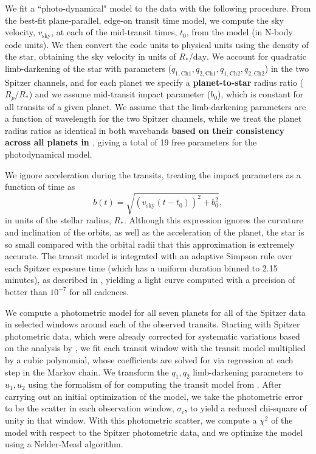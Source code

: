 \documentclass[twocolumn]{aastex63}
\begin{document}
We fit a ``photo-dynamical" model \citep{Carter2012} to the data with the following procedure.
From the best-fit plane-parallel, edge-on transit time model,
we compute the sky velocity, $v_\mathrm{sky}$, at each of the mid-transit times, $t_0$,
from the model (in N-body code units).  We then convert the code units to physical
units using the density of the star, obtaining the sky velocity in units
of $R_*/\mathrm{day}$.
We account for quadratic limb-darkening of the star with parameters ($q_\mathrm{1,Ch1}, q_\mathrm{2,Ch1},q_\mathrm{1,Ch2},q_\mathrm{2,Ch2}$) in the two Spitzer channels, and for each
planet we specify a \textbf{planet-to-star} radius ratio ($R_p/R_*$) and we assume
mid-transit impact parameter ($b_0$), which is constant for all transits of
a given planet.  We assume that the limb-darkening parameters are a function
of wavelength for the two Spitzer channels, while we treat the planet radius
ratios as identical in both wavebands \textbf{based on their consistency across
all planets in \citep{Ducrot2020}}, giving a total of 19 free parameters
for the photodynamical model.

We ignore acceleration during the transits, treating the impact parameters as
a function of time as
\begin{equation}
    b(t) = \sqrt{(v_\mathrm{sky} (t-t_0))^2 + b_0^2},
\end{equation}
in units of the stellar radius, $R_*$.
Although this expression ignores the curvature and inclination of the orbits, as well
as the acceleration of the planet, the star is so small compared with the orbital
radii that this approximation is extremely accurate.  The transit model is integrated
with an adaptive Simpson rule over each Spitzer exposure time (which has a uniform
duration binned to 2.15 minutes), as described in \citet{Agol2019}, yielding
a light curve computed with a precision of better than $10^{-7}$ for all cadences.

We compute a photometric model for all seven
planets for all of the Spitzer data in selected windows around each of the observed
transits.  Starting with Spitzer photometric data, which were already corrected for systematic
variations based on the analysis by \citet{Ducrot2020}, we fit  each transit window
with the transit model multiplied by a cubic polynomial, whose coefficients are solved
for via regression at each step in the Markov chain.
We
transform the $q_1, q_2$ limb-darkening
parameters to $u_1,u_2$ using the formalism of \citet{Kipping2013} for computing the transit model from \citet{Agol2019}.  After carrying out an initial
optimization of the model, we take the photometric error to be the
scatter in each observation window, $\sigma_i$\textbf{,} to yield a reduced chi-square of unity in
that  window.  With this photometric
scatter, we compute a $\chi^2$ of the model with respect to the Spitzer
photometric data, and we optimize the model using a Nelder-Mead algorithm.
\end{document}
